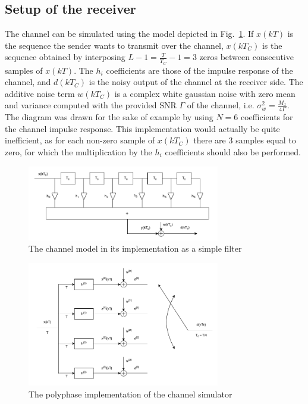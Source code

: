\documentclass[10pt]{article}
\begin{document}
\subsection*{Setup of the receiver}
The channel can be simulated using the model depicted in Fig.~\ref{fig:channel_model}. If $x(kT)$ is the sequence the sender wants to transmit over the channel, $x(kT_C)$ is the sequence obtained by interposing $L - 1 = \frac{T}{T_C} - 1 = 3$ zeros between consecutive samples of $x(kT)$. The $h_i$ coefficients are those of the impulse response of the channel, and $d(kT_C)$ is the noisy output of the channel at the receiver side. The additive noise term $w(kT_C)$ is a complex white gaussian noise with zero mean and variance computed with the provided SNR $\Gamma$ of the channel, i.e. $\sigma^2_w = \frac{M_x}{4\Gamma}$. The diagram was drawn for the sake of example by using $N = 6$ coefficients for the channel impulse response. This implementation would actually be quite inefficient, as for each non-zero sample of $x(kT_C)$ there are 3 samples equal to zero, for which the multiplication by the $h_i$ coefficients should also be performed.

\begin{figure}[ht]
	\centering
	\includegraphics[width=0.75\textwidth]{channel_model}
	\caption{The channel model in its implementation as a simple filter}
    \label{fig:channel_model}
\end{figure}

\begin{figure}[ht]
	\centering
	\includegraphics[width=0.75\textwidth]{polyphase}
	\caption{The polyphase implementation of the channel simulator}
    \label{fig:polyphase}
\end{figure}
\end{document}
